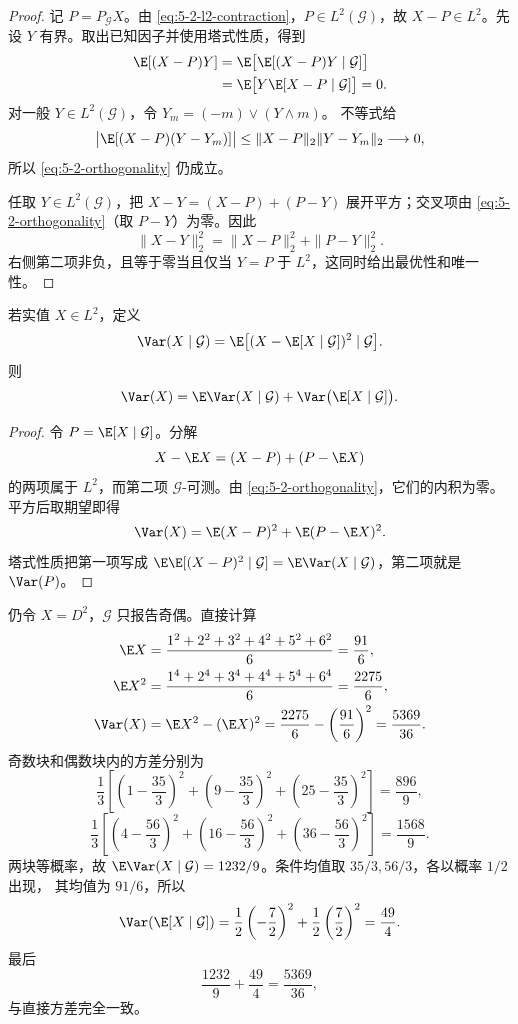 \begin{proof}
记 $P=P_{\mathcal G}X$。由 \eqref{eq:5-2-l2-contraction}，$P\in L^2(\mathcal G)$，故
$X-P\in L^2$。先设 $Y$ 有界。取出已知因子并使用塔式性质，得到
\[
 \begin{aligned}
 \E[(X-P)Y]
 &=\E\bigl[\E[(X-P)Y\mid\mathcal G]\bigr]\\
 &=\E\bigl[Y\E[X-P\mid\mathcal G]\bigr]=0.
 \end{aligned}
\]
对一般 $Y\in L^2(\mathcal G)$，令 $Y_m=(-m)\vee(Y\wedge m)$。\Holder{} 不等式给
\[
 \bigl|\E[(X-P)(Y-Y_m)]\bigr|
 \leq\|X-P\|_2\|Y-Y_m\|_2\longrightarrow0,
\]
所以 \eqref{eq:5-2-orthogonality} 仍成立。

任取 $Y\in L^2(\mathcal G)$，把
$X-Y=(X-P)+(P-Y)$ 展开平方；交叉项由
\eqref{eq:5-2-orthogonality}（取 $P-Y$）为零。因此
\begin{equation}\label{eq:5-2-pythagorean-prediction}
 \|X-Y\|_2^2=\|X-P\|_2^2+\|P-Y\|_2^2.
\end{equation}
右侧第二项非负，且等于零当且仅当 $Y=P$ 于 $L^2$，这同时给出最优性和唯一性。
\end{proof}

\begin{corollary}[总方差公式]\label{corollary:5-2-3-3}
若实值 $X\in L^2$，定义
\[
 \Var(X\mid\mathcal G)
 =\E\bigl[(X-\E[X\mid\mathcal G])^2\mid\mathcal G\bigr].
\]
则
\begin{equation}\label{eq:5-2-total-variance}
 \Var(X)=\E\Var(X\mid\mathcal G)
 +\Var\bigl(\E[X\mid\mathcal G]\bigr).
\end{equation}
\end{corollary}

\begin{proof}
令 $P=\E[X\mid\mathcal G]$。分解
\[
 X-\E X=(X-P)+(P-\E X)
\]
的两项属于 $L^2$，而第二项 $\mathcal G$-可测。由
\eqref{eq:5-2-orthogonality}，它们的内积为零。平方后取期望即得
\[
 \Var(X)=\E(X-P)^2+\E(P-\E X)^2.
\]
塔式性质把第一项写成
$\E\E[(X-P)^2\mid\mathcal G]=\E\Var(X\mid\mathcal G)$，第二项就是
$\Var(P)$。
\end{proof}

\begin{example}[总方差的骰子回算]\label{ex:5-2-3-2}
仍令 $X=D^2$，$\mathcal G$ 只报告奇偶。直接计算
\begin{align*}
 \E X&=\frac{1^2+2^2+3^2+4^2+5^2+6^2}{6}=\frac{91}{6},\\
 \E X^2&=\frac{1^4+2^4+3^4+4^4+5^4+6^4}{6}
 =\frac{2275}{6},\\
 \Var(X)&=\E X^2-(\E X)^2
 =\frac{2275}{6}-\left(\frac{91}{6}\right)^2
 =\frac{5369}{36}.
\end{align*}
奇数块和偶数块内的方差分别为
\[
 \frac13\left[\left(1-\frac{35}{3}\right)^2
 +\left(9-\frac{35}{3}\right)^2
 +\left(25-\frac{35}{3}\right)^2\right]=\frac{896}{9},
\]
\[
 \frac13\left[\left(4-\frac{56}{3}\right)^2
 +\left(16-\frac{56}{3}\right)^2
 +\left(36-\frac{56}{3}\right)^2\right]=\frac{1568}{9}.
\]
两块等概率，故
$\E\Var(X\mid\mathcal G)=1232/9$。条件均值取 $35/3,56/3$，各以概率 $1/2$ 出现，
其均值为 $91/6$，所以
\[
 \Var(\E[X\mid\mathcal G])=\frac12\left(-\frac72\right)^2
 +\frac12\left(\frac72\right)^2=\frac{49}{4}.
\]
最后
\[
 \frac{1232}{9}+\frac{49}{4}=\frac{5369}{36},
\]
与直接方差完全一致。
\end{example}

